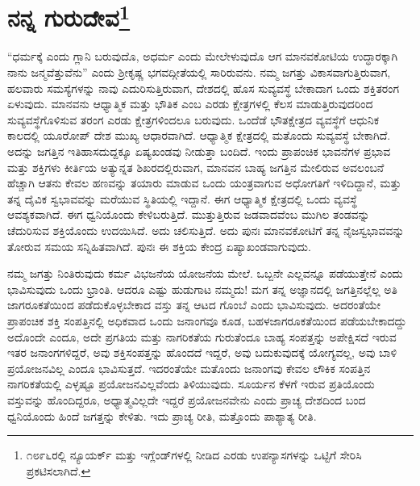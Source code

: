 
\chapter[ನನ್ನ ಗುರುದೇವರು ]{ನನ್ನ ಗುರುದೇವ\protect\footnote{೧೮೯೬ರಲ್ಲಿ ನ್ಯೂಯರ್ಕ್​ ಮತ್ತು ಇಗ್ಲೆಂಡ್​ಗಳಲ್ಲಿ ನೀಡಿದ ಎರಡು ಉಪನ್ಯಾಸಗಳನ್ನು ಒಟ್ಟಿಗೆ ಸೇರಿಸಿ ಪ್ರಕಟಿಸಲಾಗಿದೆ. }}

“ಧರ್ಮಕ್ಕೆ ಎಂದು ಗ್ಲಾನಿ ಬರುವುದೊ, ಅಧರ್ಮ ಎಂದು ಮೇಲೇಳುವುದೊ ಆಗ ಮಾನವಕೋಟಿಯ ಉದ್ಧಾರಕ್ಕಾಗಿ ನಾನು ಜನ್ಮವೆತ್ತುವೆನು” ಎಂದು ಶ‍್ರೀಕೃಷ್ಣ ಭಗವದ್ಗೀತೆಯಲ್ಲಿ ಸಾರಿರುವನು. ನಮ್ಮ ಜಗತ್ತು ವಿಕಾಸವಾಗುತ್ತಿರುವಾಗ, ಹಲವಾರು ಸಮಸ್ಯೆಗಳನ್ನು ನಾವು ಎದುರಿಸುತ್ತಿರುವಾಗ, ದೇಶದಲ್ಲಿ ಹೊಸ ಸುವ್ಯವಸ್ಥೆ ಬೇಕಾದಾಗ ಒಂದು ಶಕ್ತಿತರಂಗ ಏಳುವುದು. ಮಾನವನು ಆಧ್ಯಾತ್ಮಿಕ ಮತ್ತು ಭೌತಿಕ ಎಂಬ ಎರಡು ಕ್ಷೇತ್ರಗಳಲ್ಲಿ ಕೆಲಸ ಮಾಡುತ್ತಿರುವುದರಿಂದ ಸುವ್ಯವಸ್ಥೆಗೊಳಿಸುವ ತರಂಗ ಎರಡು ಕ್ಷೇತ್ರಗಳಿಂದಲೂ ಬರುವುದು. ಒಂದೆಡೆ ಭೌತಕ್ಷೇತ್ರದ ವ್ಯವಸ್ಥೆಗೆ ಆಧುನಿಕ ಕಾಲದಲ್ಲಿ ಯೂರೋಪ್​ ದೇಶ ಮುಖ್ಯ ಆಧಾರವಾಗಿದೆ. ಆಧ್ಯಾತ್ಮಿಕ ಕ್ಷೇತ್ರದಲ್ಲಿ ಮತೊಂದು ಸುವ್ಯವಸ್ಥೆ ಬೇಕಾಗಿದೆ. ಅದನ್ನು ಜಗತ್ತಿನ ಇತಿಹಾಸದುದ್ದಕ್ಕೂ ಏಷ್ಯಖಂಡವು ನೀಡುತ್ತಾ ಬಂದಿದೆ. ಇಂದು ಪ್ರಾಪಂಚಿಕ ಭಾವನೆಗಳ ಪ್ರಭಾವ ಮತ್ತು ಶಕ್ತಿಗಳು ಕೀರ್ತಿಯ ಅತ್ಯುನ್ನತ ಶಿಖರದಲ್ಲಿರುವಾಗ, ಮಾನವನ ಬಾಹ್ಯ ಜಗತ್ತಿನ ಮೇಲಿರುವ ಅವಲಂಬನೆ ಹೆಚ್ಚಾಗಿ ಆತನು ಕೇವಲ ಹಣವನ್ನು ತಯಾರು ಮಾಡುವ ಒಂದು ಯಂತ್ರವಾಗುವ ಅಧೋಗತಿಗೆ ಇಳಿದಿದ್ದಾನೆ, ಮತ್ತು ತನ್ನ ದೈವಿಕ ಸ್ವಭಾವವನ್ನು ಮರೆಯುವ ಸ್ಥಿತಿಯಲ್ಲಿ ಇದ್ದಾನೆ. ಈಗ ಆಧ್ಯಾತ್ಮಿಕ ಕ್ಷೇತ್ರದಲ್ಲಿ ಒಂದು ವ್ಯವಸ್ಥೆ ಆವಶ್ಯಕವಾಗಿದೆ. ಈಗ ಧ್ವನಿಯೊಂದು ಕೇಳಿಬರುತ್ತಿದೆ. ಮುತ್ತುತ್ತಿರುವ ಜಡವಾದವೆಂಬ ಮುಗಿಲ ತಂಡವನ್ನು ಚೆದುರಿಸುವ ಶಕ್ತಿಯೊಂದು ಉದಯಿಸಿದೆ. ಅದು ಚಲಿಸುತ್ತಿದೆ. ಅದು ಪುನಃ ಮಾನವಕೋಟಿಗೆ ತನ್ನ ನೈಜಸ್ವಭಾವವನ್ನು ತೋರುವ ಸಮಯ ಸನ್ನಿಹಿತವಾಗಿದೆ. ಪುನಃ ಈ ಶಕ್ತಿಯ ಕೇಂದ್ರ ಏಷ್ಯಾಖಂಡವಾಗುವುದು.

ನಮ್ಮ ಜಗತ್ತು ನಿಂತಿರುವುದು ಕರ್ಮ ವಿಭಜನೆಯ ಯೋಜನೆಯ ಮೇಲೆ. ಒಬ್ಬನೇ ಎಲ್ಲವನ್ನೂ ಪಡೆಯುತ್ತೇನೆ ಎಂದು ಭಾವಿಸುವುದು ಒಂದು ಭ್ರಾಂತಿ. ಆದರೂ ಎಷ್ಟು ಹುಡುಗಾಟ ನಮ್ಮದು! ಮಗ ತನ್ನ ಅಜ್ಞಾನದಲ್ಲಿ ಜಗತ್ತಿನಲ್ಲೆಲ್ಲ ಅತಿ ಜಾಗರೂಕತೆಯಿಂದ ಪಡೆದುಕೊಳ್ಳಬೇಕಾದ ವಸ್ತು ತನ್ನ ಆಟದ ಗೊಂಬೆ ಎಂದು ಭಾವಿಸುವುದು. ಅದರಂತೆಯೇ ಪ್ರಾಪಂಚಿಕ ಶಕ್ತಿ ಸಂಪತ್ತಿನಲ್ಲಿ ಅಧಿಕವಾದ ಒಂದು ಜನಾಂಗವೂ ಕೂಡ, ಬಹಳ\break ಜಾಗರೂಕತೆಯಿಂದ ಪಡೆಯಬೇಕಾದದ್ದು ಅದೊಂದೇ ಎಂದೂ, ಅದೇ ಪ್ರಗತಿಯ ಮತ್ತು ನಾಗರಿಕತೆಯ ಗುರುತೆಂದೂ ಬಾಹ್ಯ ಸಂಪತ್ತನ್ನು ಅಪೇಕ್ಷಿಸದೆ ಇರುವ ಇತರ ಜನಾಂಗಗಳಿದ್ದರೆ, ಅವು ಶಕ್ತಿಸಂಪತ್ತನ್ನು ಹೊಂದದೆ ಇದ್ದರೆ, ಅವು ಬದುಕುವುದಕ್ಕೆ ಯೋಗ್ಯವಲ್ಲ, ಅವು ಬಾಳಿ ಪ್ರಯೋಜನವಿಲ್ಲ ಎಂದೂ ಭಾವಿಸುತ್ತದೆ. ಇದರಂತೆಯೇ ಮತೊಂದು ಜನಾಂಗವು ಕೇವಲ ಲೌಕಿಕ ಸಂಪತ್ತಿನ ನಾಗರಿಕತೆಯಲ್ಲಿ ಎಳ್ಳಷ್ಟೂ ಪ್ರಯೋಜನವಿಲ್ಲವೆಂದು ತಿಳಿಯುವುದು. ಸೂರ್ಯನ ಕೆಳಗೆ ಇರುವ ಪ್ರತಿಯೊಂದು ವಸ್ತುವನ್ನು ಹೊಂದಿದ್ದರೂ, ಅಧ್ಯಾತ್ಮವಿಲ್ಲದೇ ಇದ್ದರೆ ಪ್ರಯೋಜನವೇನು ಎಂದು ಪ್ರಾಚ್ಯ ದೇಶದಿಂದ ಬಂದ ಧ್ವನಿಯೊಂದು ಹಿಂದೆ ಜಗತ್ತನ್ನು ಕೇಳಿತು. ಇದು ಪ್ರಾಚ್ಯ ರೀತಿ, ಮತ್ತೊಂದು ಪಾಶ್ಯಾತ್ಯ ರೀತಿ.

